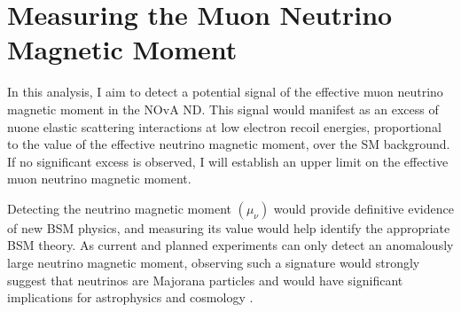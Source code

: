 \chapter{Measuring the Muon Neutrino Magnetic Moment}\label{sec:NeutrinoMagMoment}

In this analysis, I aim to detect a potential signal of the effective muon neutrino magnetic moment in the \gls{NOvA} \gls{ND}. This signal would manifest as an excess of \gls{nuone} elastic scattering interactions at low electron recoil energies, proportional to the value of the effective neutrino magnetic moment, over the \gls{SM} background. If no significant excess is observed, I will establish an upper limit on the effective muon neutrino magnetic moment.



Detecting the neutrino magnetic moment $\left(\mu_\nu\right)$ would provide definitive evidence of new \gls{BSM} physics, and measuring its value would help identify the appropriate \gls{BSM} theory. As current and planned experiments can only detect an anomalously large neutrino magnetic moment, observing such a signature would strongly suggest that neutrinos are Majorana particles and would have significant implications for astrophysics and cosmology \cite{SnowmassNeutrinoFrontierReport.pdf}.



